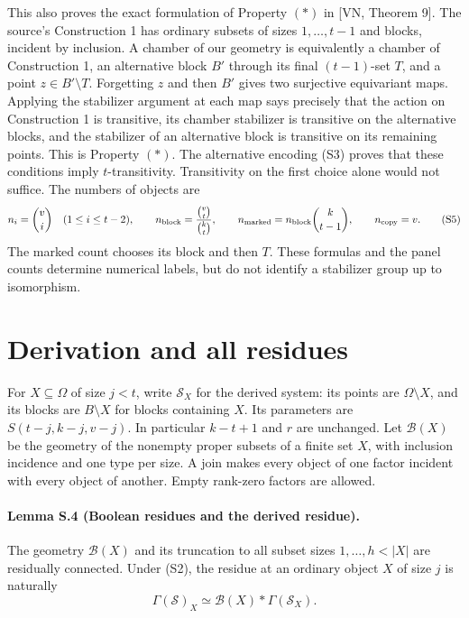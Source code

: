 This also proves the exact formulation of Property $(*)$ in
[VN, Theorem 9]. The source's Construction 1 has ordinary subsets of
sizes $1,\ldots,t-1$ and blocks, incident by inclusion. A chamber of
our geometry is equivalently a chamber of Construction 1, an alternative
block $B'$ through its final $(t-1)$-set $T$, and a point
$z\in B'\setminus T$. Forgetting $z$ and then $B'$ gives two
surjective equivariant maps. Applying the stabilizer argument at each
map says precisely that the action on Construction 1 is transitive,
its chamber stabilizer is transitive on the alternative blocks, and
the stabilizer of an alternative block is transitive on its remaining
points. This is Property $(*)$. The alternative encoding (S3) proves
that these conditions imply $t$-transitivity. Transitivity on the first
choice alone would not suffice. The numbers of objects are
\[
 n_i=\binom vi\quad(1\leq i\leq t-2),\qquad
 n_{\rm block}=\frac{\binom vt}{\binom kt},\qquad
 n_{\rm marked}=n_{\rm block}\binom{k}{t-1},\qquad
 n_{\rm copy}=v.                                             \tag{S5}
\]
The marked count chooses its block and then $T$. These formulas and
the panel counts determine numerical labels, but do not identify a
stabilizer group up to isomorphism.

\section{Derivation and all residues}

For $X\subseteq\Omega$ of size $j<t$, write $\mathcal S_X$ for
the derived system: its points are $\Omega\setminus X$, and its
blocks are $B\setminus X$ for blocks containing $X$. Its parameters
are $S(t-j,k-j,v-j)$. In particular $k-t+1$ and $r$ are unchanged.
Let $\mathcal B(X)$ be the geometry of the nonempty proper subsets
of a finite set $X$, with inclusion incidence and one type per size.
A join makes every object of one factor incident with every object
of another. Empty rank-zero factors are allowed.

\paragraph{Lemma S.4 (Boolean residues and the derived residue).}
The geometry $\mathcal B(X)$ and its truncation to all subset sizes
$1,\ldots,h<|X|$ are residually connected. Under (S2), the residue
at an ordinary object $X$ of size $j$ is naturally
\[
 \Gamma(\mathcal S)_X\simeq
 \mathcal B(X)*\Gamma(\mathcal S_X).                          \tag{S6}
\]

